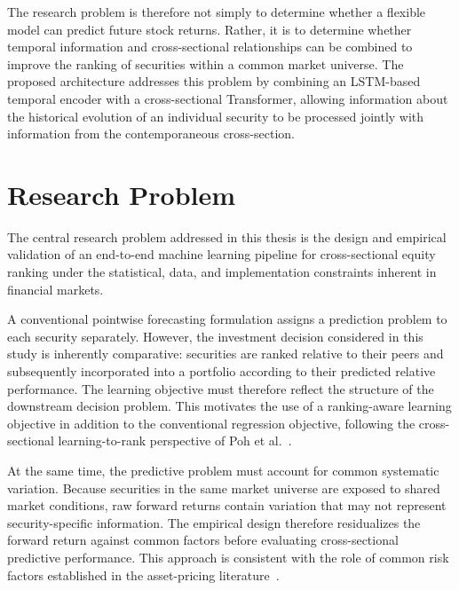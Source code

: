 The research problem is therefore not simply to determine whether a flexible model can predict future stock returns. Rather, it is to determine whether temporal information and cross-sectional relationships can be combined to improve the ranking of securities within a common market universe. The proposed architecture addresses this problem by combining an \acs{LSTM}-based temporal encoder with a cross-sectional Transformer, allowing information about the historical evolution of an individual security to be processed jointly with information from the contemporaneous cross-section.

\section{Research Problem}
The central research problem addressed in this thesis is the design and empirical validation of an end-to-end machine learning pipeline for cross-sectional equity ranking under the statistical, data, and implementation constraints inherent in financial markets.

\medskip

A conventional pointwise forecasting formulation assigns a prediction problem to each security separately. However, the investment decision considered in this study is inherently comparative: securities are ranked relative to their peers and subsequently incorporated into a portfolio according to their predicted relative performance. The learning objective must therefore reflect the structure of the downstream decision problem. This motivates the use of a ranking-aware learning objective in addition to the conventional regression objective, following the cross-sectional learning-to-rank perspective of Poh et al.~\cite{Poh2021}.

\medskip

At the same time, the predictive problem must account for common systematic variation. Because securities in the same market universe are exposed to shared market conditions, raw forward returns contain variation that may not represent security-specific information. The empirical design therefore residualizes the forward return against common factors before evaluating cross-sectional predictive performance. This approach is consistent with the role of common risk factors established in the asset-pricing literature~\cite{FamaFrench1992,FamaFrench1993}.

\medskip

